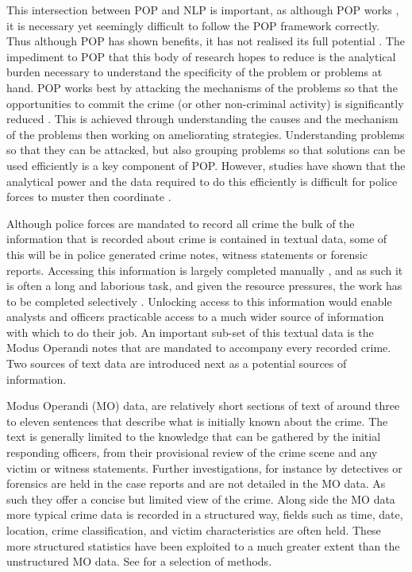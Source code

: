 This intersection between POP and NLP is important, as although POP works \parencite{hinkle2020problem}, it is necessary yet seemingly difficult to follow the POP framework correctly. Thus although POP has shown benefits, it has not realised its full potential \parencite{POPUCL}. The impediment to POP that this body of research hopes to reduce is the analytical burden necessary to understand the specificity of the problem or problems at hand. POP works best by attacking the mechanisms of the problems so that the opportunities to commit the crime (or other non-criminal activity) is significantly reduced \parencite{clarke2003becoming}. This is achieved through understanding the causes and the mechanism of the problems then working on ameliorating strategies. Understanding problems so that they can be attacked, but also grouping problems so that solutions can be used efficiently is a key component of POP. However, studies have shown that the analytical power and the data required to do this efficiently is difficult for police forces to muster then coordinate \parencite{sidebottom2020implementing}. 

Although police forces are mandated to record all crime \parencite{home2020crime} the bulk of the information that is recorded about crime is contained in textual data, some of this will be in police generated crime notes, witness statements or forensic reports. Accessing this information is largely completed manually \parencite{goldstein1990}, and as such it is often a long and laborious task, and given the resource pressures, the work has to be completed selectively \parencite{rogerson2016utility}. Unlocking access to this information would enable analysts and officers practicable access to a much wider source of information with which to do their job. An important sub-set of this textual data is the Modus Operandi notes that are mandated to accompany every recorded crime. Two sources of text data are introduced next as a potential sources of information.   
 
Modus Operandi (MO) data, are relatively short sections of text of around three to eleven  sentences that describe what is initially known about the crime.  The text is generally limited to the knowledge that can be gathered by the initial responding officers, from their provisional review of the crime scene and any victim or witness statements. Further investigations,  for instance by detectives or forensics are held in the case reports and are not detailed in the MO data. As such they offer a concise but limited view of the crime. Along side the MO data more typical crime data is recorded in a structured way, fields such as time, date, location, crime classification, and victim characteristics are often held. These more structured statistics have been exploited to a much greater extent  than the unstructured MO data. See \textcite{mapchap10, ratcliffe1998aoristic, braga2014effects, weisel2016analyzing}  for a selection of methods.

